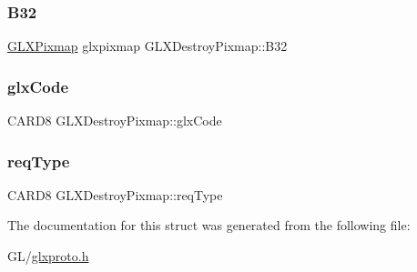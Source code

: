 \subsubsection{\texorpdfstring{B32}{B32}}
{\footnotesize\ttfamily \hyperlink{glx_8h_a6577d581069de43ebaac50c78dbccbd0}{G\+L\+X\+Pixmap} glxpixmap G\+L\+X\+Destroy\+Pixmap\+::\+B32}

\mbox{\label{struct_g_l_x_destroy_pixmap_a87c2f45267bd1808cc1b6c27699a3b64}} 
\subsubsection{\texorpdfstring{glx\+Code}{glxCode}}
{\footnotesize\ttfamily C\+A\+R\+D8 G\+L\+X\+Destroy\+Pixmap\+::glx\+Code}

\mbox{\label{struct_g_l_x_destroy_pixmap_a761991ed44aee6079ede39f1c2a50f33}} 
\subsubsection{\texorpdfstring{req\+Type}{reqType}}
{\footnotesize\ttfamily C\+A\+R\+D8 G\+L\+X\+Destroy\+Pixmap\+::req\+Type}



The documentation for this struct was generated from the following file\+:\begin{DoxyCompactItemize}
\item 
G\+L/\hyperlink{glxproto_8h}{glxproto.\+h}\end{DoxyCompactItemize}
